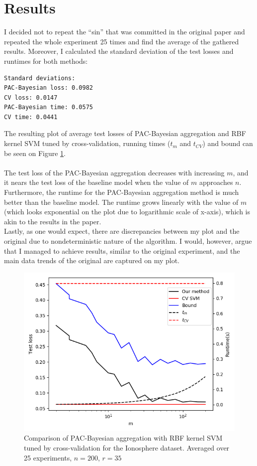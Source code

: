 \documentclass[a4paper]{article}
\begin{document}
\section{Results}
I decided not to repeat the ``sin'' that was committed in the original paper and
repeated the whole experiment 25 times and find the average of the gathered
results. Moreover, I calculated the standard deviation of the test losses and
runtimes for both methods:

\begin{verbatim}
Standard deviations:
PAC-Bayesian loss: 0.0982
CV loss: 0.0147
PAC-Bayesian time: 0.0575
CV time: 0.0441
\end{verbatim}
The resulting plot of average test losses of PAC-Bayesian aggregation and RBF
kernel SVM tuned by cross-validation, running times ($t_m$ and $t_{CV}$) and
bound can be seen on Figure \ref{plt1}.\\\\
The test loss of the PAC-Bayesian aggregation decreases with increasing
$m$, and it nears the test loss of the baseline model when the value of $m$
approaches $n$. \\
Furthermore, the runtime for the PAC-Bayesian aggregation method
is much better than the baseline model. The runtime grows linearly with the
value of $m$ (which looks exponential on the plot due to logarithmic scale of
x-axis), which is akin to the results in the paper. \\
Lastly, as one would expect, there are discrepancies between my plot and the
original due to nondeterministic nature of the algorithm. I would, however, argue
that I managed to achieve results, similar to the original experiment, and
the main data trends of the original are captured on my plot.

\newpage
\vspace*{\fill}
\begin{figure}[H]
  \centering
  \includegraphics[width=\textwidth]{code/plt_avg25_1}
  \caption{Comparison of PAC-Bayesian aggregation with RBF kernel SVM
    tuned by cross-validation for the Ionosphere dataset. Averaged over 25 experiments, $n=200$, $r=35$}
  \label{plt1}
\end{figure}
\vspace*{\fill}
\end{document}
